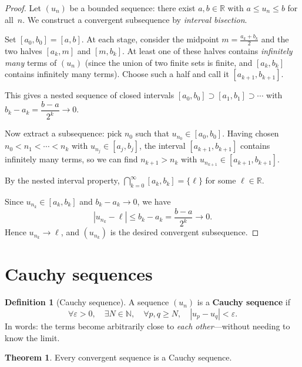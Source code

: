 \documentclass[12pt,a4paper,openany]{book}
\newcommand{\N}{\mathbb{N}}
\newcommand{\R}{\mathbb{R}}
\newcommand{\eps}{\varepsilon}
\newcommand{\abs}[1]{\left\lvert #1 \right\rvert}
\theoremstyle{definition}
\newtheorem{definition}{Definition}[chapter]
\newtheorem{theorem}{Theorem}[chapter]
\theoremstyle{remark}
\begin{document}
\begin{proof}
Let $(u_n)$ be a bounded sequence: there exist $a, b \in \R$ with
$a \leq u_n \leq b$ for all~$n$. We construct a convergent subsequence by
\emph{interval bisection}.

Set $[a_0, b_0] = [a, b]$. At each stage, consider the midpoint
$m = \frac{a_k + b_k}{2}$ and the two halves $[a_k, m]$ and $[m, b_k]$.
At least one of these halves contains \emph{infinitely many} terms of $(u_n)$
(since the union of two finite sets is finite, and $[a_k, b_k]$ contains
infinitely many terms). Choose such a half and call it $[a_{k+1}, b_{k+1}]$.

This gives a nested sequence of closed intervals
$[a_0, b_0] \supset [a_1, b_1] \supset \cdots$ with
$b_k - a_k = \dfrac{b - a}{2^k} \to 0$.

Now extract a subsequence: pick $n_0$ such that $u_{n_0} \in [a_0, b_0]$.
Having chosen $n_0 < n_1 < \cdots < n_k$ with $u_{n_j} \in [a_j, b_j]$,
the interval $[a_{k+1}, b_{k+1}]$ contains infinitely many terms, so we can
find $n_{k+1} > n_k$ with $u_{n_{k+1}} \in [a_{k+1}, b_{k+1}]$.

By the nested interval property, $\displaystyle \bigcap_{k=0}^{\infty}
[a_k, b_k] = \{\ell\}$ for some $\ell \in \R$.

Since $u_{n_k} \in [a_k, b_k]$ and $b_k - a_k \to 0$, we have
\[
   \abs{u_{n_k} - \ell} \leq b_k - a_k = \frac{b-a}{2^k} \to 0.
\]
Hence $u_{n_k} \to \ell$, and $(u_{n_k})$ is the desired convergent subsequence.
\end{proof}

\section{Cauchy sequences}\label{sec:cauchy}

\begin{definition}[Cauchy sequence]\label{def:cauchy}
A sequence $(u_n)$ is a \textbf{Cauchy sequence} if
\[
   \forall \eps > 0, \quad \exists N \in \N, \quad
   \forall p, q \geq N, \quad \abs{u_p - u_q} < \eps.
\]
In words: the terms become arbitrarily close to \emph{each other}---without
needing to know the limit.
\end{definition}

\begin{theorem}\label{thm:conv-implies-cauchy}
Every convergent sequence is a Cauchy sequence.
\end{theorem}
\end{document}
